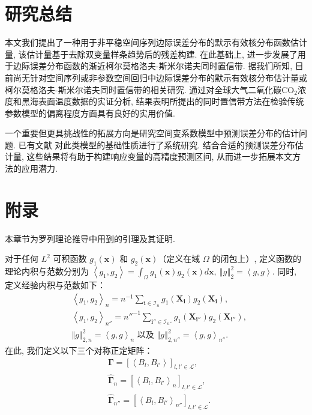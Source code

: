 \documentclass[a4paper,openay,14pt]{ctexbook}
\numberwithin{equation}{section}
\numberwithin{lem}{section}
\newcommand{\chapterwithfancyheader}[1]{  
    \chapter{#1} %
    \thispagestyle{fancy} %
}
\begin{document}
\chapterwithfancyheader{研究总结}\label{SEC: Conclusion}
本文我们提出了一种用于非平稳空间序列边际误差分布的默示有效核分布函数估计量, 该估计量基于去除双变量样条趋势后的残差构建. 在此基础上, 进一步发展了用于边际误差分布函数的渐近柯尔莫格洛夫-斯米尔诺夫同时置信带. 据我们所知, 目前尚无针对空间序列或非参数空间回归中边际误差分布的默示有效核分布估计量或 柯尔莫格洛夫-斯米尔诺夫同时置信带的相关研究. 通过对全球大气二氧化碳CO$_2$浓度和黑海表面温度数据的实证分析, 结果表明所提出的同时置信带方法在检验传统参数模型的偏离程度方面具有良好的实用价值.

一个重要但更具挑战性的拓展方向是研究空间变系数模型中预测误差分布的估计问题. 已有文献 \cite{mu2018estimation,wang2020efficient,mu2020spatial} 对此类模型的基础性质进行了系统研究. 结合合适的预测误差分布估计量, 这些结果将有助于构建响应变量的高精度预测区间, 从而进一步拓展本文方法的应用潜力.

\backmatter
\newpage
{}  




\newpage
\pagestyle{fancy}
\chapterwithfancyheader{附录}\label{SEC: proof}
\setcounter{section}{0}
\setcounter{equation}{0}
\def\theequation{A.\arabic{equation}}
\def\thesection{A}
\renewcommand{\thelemma}{A.\arabic{lemma}} 

本章节为罗列理论推导中用到的引理及其证明. 

对于任何 $L^2$ 可积函数 $g_1(\boldsymbol{x})$ 和 $g_2(\boldsymbol{x})$（定义在域 $\Omega$ 的闭包上）, 定义函数的理论内积与范数分别为
\(\left<g_1,g_2\right> = \int_{\Omega}g_1(\boldsymbol{x})g_2(\boldsymbol{x})d\boldsymbol{x},~\left\Vert g\right\Vert^2_2 = \left<g,g\right>\). 同时, 定义经验内积与范数如下：
\begin{align*}
 &\left<g_1,g_2\right>_{n} = n^{-1}\sum_{\mathbf{i} \in \mathcal{I}_n} g_1(\boldsymbol{X}_{\mathbf{i}})g_2(\boldsymbol{X}_{\mathbf{i}}),\\
 & \left<g_1,g_2\right>_{n''} = n''^{-1}\sum_{\mathbf{i}''\in\mathcal{I}_{n''}}g_1(\boldsymbol{X}_{\mathbf{i}''})g_2(\boldsymbol{X}_{\mathbf{i}''}),\\
 & \left\Vert g\right\Vert^{2}_{2,n} = \left<g,g\right>_{n}\text{ 以及 } \left\Vert g\right\Vert^{2}_{2,n''} = \left<g,g\right>_{n''}.
\end{align*}
在此, 我们定义以下三个对称正定矩阵：
\begin{align}
    &\bm{\Gamma} = \left[\left\langle B_l,B_{l'}\right\rangle\right]_{l,l'\in\mathcal{L}}, \label{EQU:Gammalambda}\\
    &\hat{\bm{\Gamma}}_{n} = \left[\left\langle B_l,B_{l'}\right\rangle_{n}\right]_{l,l'\in\mathcal{L}},\label{EQU:hatGammalambdan}\\
    &\hat{\bm{\Gamma}}_{n''} = \left[\left\langle B_l,B_{l'}\right\rangle_{n''}\right]_{l,l'\in\mathcal{L}}. \label{EQU:hatGammalambdan''}
\end{align}
\end{document}
